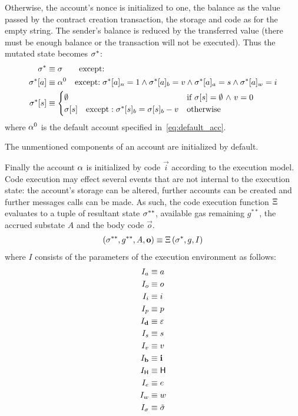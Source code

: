 Otherwise, the account's nonce is initialized to one, the balance as the value passed by the contract creation transaction,
the storage and code as for the empty string.
The sender's balance is reduced by the transferred value (there must be enough balance or the transaction will not be executed).
Thus the mutated state becomes $\mathbf{\sigma}^*$:
\begin{align}
	\mathbf{\sigma}^* & \equiv \mathbf{\sigma} \qquad{ \text{except:}}\\
	\mathbf{\sigma}^*[a] &\equiv \mathbf{\alpha}^0 \quad\text{except:}\; \mathbf{\sigma}^*[a]_n=1 \wedge \mathbf{\sigma}^*[a]_b=v \wedge \mathbf{\sigma}^*[a]_a=s \wedge \mathbf{\sigma}^*[a]_w=i\\
	\mathbf{\sigma}^*[s] &\equiv \begin{cases}
		\emptyset & \mbox{if $\mathbf{\sigma}[s]=\emptyset$ $\land$ $v=0$}\\
		\mathbf{\sigma}[s]\quad\mbox{except}:	\mathbf{\sigma}^*[s]_b=\mathbf{\sigma}[s]_b-v	& \mbox{otherwise}
	\end{cases}
\end{align}
where $\mathbf{\alpha}^0$ is the default account specified in~\cref{eq:default_acc}. 

The unmentioned components of an account are initialized by default.

Finally the account $\mathbf{\alpha}$ is initialized by \cvm code $\vec{i}$ according to the execution model.
Code execution may effect several events that are not internal to the execution state:
the account's storage can be altered, further accounts can be created and further messages calls can be made.
As such, the code execution function $\mathrm{\Xi}$ evaluates to a tuple of resultant state $\mathbf{\sigma}^{**}$, available gas remaining $g^{**}$, the accrued substate $A$ and the body code $\vec{o}$.
\begin{align}
	\left(\mathbf{\sigma}^{**}, g^{**},  A, \mathbf{o} \right) \equiv \mathrm{\Xi}\left(\mathbf{\sigma}^*, g, I\right)
\end{align}
where $I$ consists of the parameters of the execution environment as follows:
\begin{align}
	I_a &\equiv a\\
	I_o &\equiv o\\
	I_i &\equiv i\\
	I_p &\equiv p\\
	I_{\mathbf{d}} &\equiv \mathbb{\varepsilon}\\
	I_s &\equiv s\\
	I_v &\equiv v\\
	I_{\mathbf{b}} &\equiv \mathbf{i}\\
	I_{\textsf{H}} & \equiv \textsf{H} \\
	I_e &\equiv e\\
	I_w &\equiv w\\
	I_{\mathbf{\sigma}} & \equiv\tilde{\mathbf{\sigma}}
\end{align}

